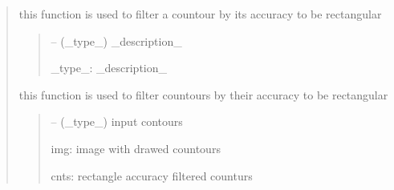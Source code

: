 \documentclass[letterpaper,10pt,english]{sphinxmanual}
\begin{document}
\begin{quote}
\begin{savenotes}
\begin{fulllineitems}
\begin{savenotes}\begin{fulllineitems}
\label{\detokenize{setting/backend/pxvalue_calibration:oxin.backend.pxvalue_calibration.extract_info.filter_acc}}
\pysigstartsignatures
{}
\pysigstopsignatures
\sphinxAtStartPar
this function is used to filter a countour by its accuracy to be rectangular
\begin{quote}\begin{description}
\sphinxAtStartPar
{} – (\_type\_) \_description\_

\sphinxAtStartPar
\_type\_: \_description\_

\end{description}\end{quote}

\end{fulllineitems}\end{savenotes}


\begin{savenotes}\begin{fulllineitems}
\label{\detokenize{setting/backend/pxvalue_calibration:oxin.backend.pxvalue_calibration.extract_info.filter_contours_by_accuracy}}
\pysigstartsignatures
{}
\pysigstopsignatures
\sphinxAtStartPar
this function is used to filter countours by their accuracy to be rectangular
\begin{quote}\begin{description}
\sphinxAtStartPar
{} – (\_type\_) input contours

\sphinxAtStartPar
img: image with drawed countours

\sphinxAtStartPar
cnts: rectangle accuracy filtered counturs

\end{description}\end{quote}


\end{fulllineitems}
\end{savenotes}
\end{fulllineitems}
\end{savenotes}
\end{quote}
\end{document}
